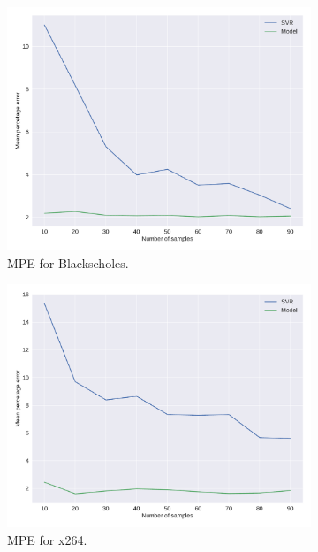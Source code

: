 \begin{figure}[H]
\begin{subfigure}[b]{0.45\textwidth}
		\centerline{\includegraphics[width=\columnwidth]{models/figures/overhead/completo_black_6.pdf}}
		\caption{MPE for Blackscholes.}
		\label{fig:overhead_black}
	\end{subfigure}
	\par\bigskip
	\begin{subfigure}[b]{0.45\textwidth}
		\centerline{\includegraphics[width=\columnwidth]{models/figures/overhead/completo_x264_4.pdf}}
		\caption{MPE for x264.}
		\label{fig:overhead_x264}
	\end{subfigure}
	\begin{subfigure}[b]{0.45\textwidth}

\end{subfigure}
\end{figure}
